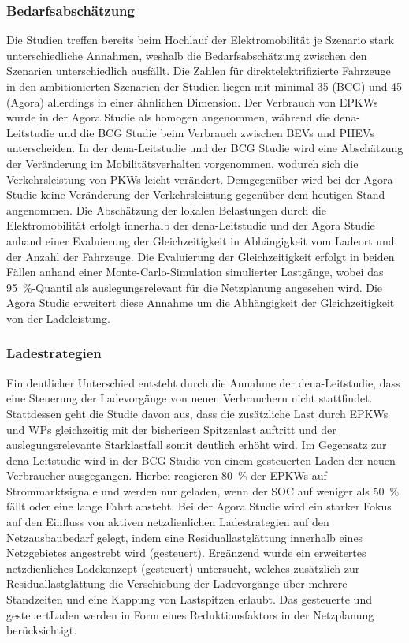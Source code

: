 


\subsubsection{Bedarfsabschätzung}

Die Studien treffen bereits beim Hochlauf der Elektromobilität je Szenario stark unterschiedliche Annahmen, weshalb die Bedarfsabschätzung zwischen den Szenarien unterschiedlich ausfällt.
Die Zahlen für direktelektrifizierte Fahrzeuge in den ambitionierten Szenarien der Studien liegen mit minimal \SI{35}{\MioFZs} (BCG) und \SI{45}{\MioFZs} (Agora) allerdings in einer ähnlichen Dimension.
Der Verbrauch von \glspl{EPKW} wurde in der Agora Studie als homogen angenommen, während die dena-Leitstudie und die BCG Studie beim Verbrauch zwischen \glspl{BEV} und \glspl{PHEV} unterscheiden.
In der dena-Leitstudie und der BCG Studie wird eine Abschätzung der Veränderung im Mobilitätsverhalten vorgenommen, wodurch sich die Verkehrsleistung von \glspl{PKW} leicht verändert.
Demgegenüber wird bei der Agora Studie keine Veränderung der Verkehrsleistung gegenüber dem heutigen Stand angenommen.
Die Abschätzung der lokalen Belastungen durch die Elektromobilität erfolgt innerhalb der dena-Leitstudie und der Agora Studie anhand einer Evaluierung der Gleichzeitigkeit in Abhängigkeit vom Ladeort und der Anzahl der Fahrzeuge.
Die Evaluierung der Gleichzeitigkeit erfolgt in beiden Fällen anhand einer Monte-Carlo-Simulation simulierter Lastgänge, wobei das \SI{95}{\percent}-Quantil als auslegungsrelevant für die Netzplanung angesehen wird.
Die Agora Studie erweitert diese Annahme um die Abhängigkeit der Gleichzeitigkeit von der Ladeleistung.


\subsubsection{Ladestrategien}

Ein deutlicher Unterschied entsteht durch die Annahme der dena-Leitstudie, dass eine Steuerung der Ladevorgänge von neuen Verbrauchern nicht stattfindet.
Stattdessen geht die Studie davon aus, dass die zusätzliche Last durch \glspl{EPKW} und \glspl{WP} gleichzeitig mit der bisherigen Spitzenlast auftritt und der auslegungsrelevante Starklastfall somit deutlich erhöht wird.
Im Gegensatz zur dena-Leitstudie wird in der BCG-Studie von einem gesteuerten Laden der neuen Verbraucher ausgegangen.
Hierbei reagieren \SI{80}{\percent} der \glspl{EPKW} auf Strommarktsignale und werden nur geladen, wenn der \gls{SOC} auf weniger als \SI{50}{\percent} fällt oder eine lange Fahrt ansteht.
Bei der Agora Studie wird ein starker Fokus auf den Einfluss von aktiven netzdienlichen Ladestrategien auf den Netzausbaubedarf gelegt, indem eine Residuallastglättung innerhalb eines Netzgebietes angestrebt wird (gesteuert).
Ergänzend wurde ein erweitertes netzdienliches Ladekonzept (gesteuert\Plusdot) untersucht, welches zusätzlich zur Residuallastglättung die Verschiebung der Ladevorgänge über mehrere Standzeiten und eine Kappung von Lastspitzen erlaubt.
Das gesteuerte und gesteuert\Plus Laden werden in Form eines Reduktionsfaktors in der Netzplanung berücksichtigt.


